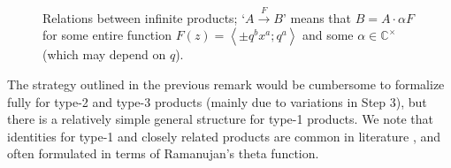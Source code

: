 \documentclass[reqno,11pt]{amsart}
\theoremstyle{definition}
\theoremstyle{remark}
\numberwithin{equation}{section}
\newcommand{\C}{\mathbb{C}}
\newcommand{\la}{\left\langle}
\newcommand{\ra}{\right\rangle}
\newcommand{\txt}{\textnormal}
\begin{document}
\begin{figure}[ht]
\captionsetup{width=0.8\linewidth}
\centering \small 
{}
\caption{Relations between infinite products; `$A \xrightarrow{F} B$' means that $B = A \cdot \alpha F$ for some entire function $F(z) = \la \pm q^b x^a; q^a \ra$ and some $\alpha \in \C^\times$ (which may depend on $q$).}
\label{fig:products}
\end{figure}

The strategy outlined in the previous remark would be cumbersome to formalize fully for type-2 and type-3 products (mainly due to variations in Step 3), but there is a relatively simple general structure for type-1 products. We note that identities for type-1 and closely related products are common in literature \cite{chu2007unification,adiga2014identities,yan2009several}, and often formulated in terms of Ramanujan's theta function.
\end{document}
